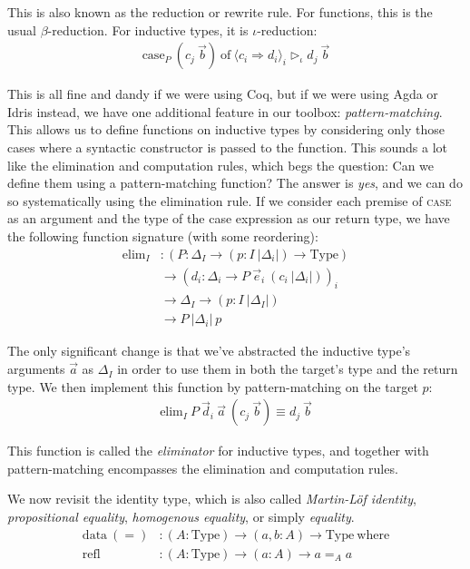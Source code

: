 \documentclass{report}
\newcommand{\const}[1]{\text{#1}}
\newcommand{\data}{\const{data}}
\newcommand{\Type}{\const{Type}}
\newcommand{\where}{\const{where}}
\newcommand{\case}{\const{case}}
\newcommand{\of}{\const{of}}
\newcommand{\elim}{\const{elim}}
\newcommand{\refl}{\const{refl}}
\newcommand{\refrule}[1]{\textsc{#1}}
\begin{document}
This is also known as the reduction or rewrite rule. For functions, this is the usual $\beta$-reduction. For inductive types, it is $\iota$-reduction:
%
\begin{align*}
    \case_P ~ (c_j ~ \Vec{b}) ~ \of ~ \langle c_i \Rightarrow d_i \rangle_i \rhd_\iota d_j ~ \Vec{b}
\end{align*}

This is all fine and dandy if we were using Coq, but if we were using Agda or Idris instead, we have one additional feature in our toolbox: \emph{pattern-matching}. This allows us to define functions on inductive types by considering only those cases where a syntactic constructor is passed to the function. This sounds a lot like the elimination and computation rules, which begs the question: Can we define them using a pattern-matching function? The answer is \emph{yes}, and we can do so systematically using the elimination rule. If we consider each premise of \refrule{case} as an argument and the type of the case expression as our return type, we have the following function signature (with some reordering):
%
\begin{align*}
    \elim_I &: (P : \Delta_I \to (p : I ~ |\Delta_i|) \to \Type) \\
    &\to (d_i : \Delta_i \to P ~ \Vec{e}_i ~ (c_i ~ |\Delta_i|))_i \\
    &\to \Delta_I \to (p : I ~ |\Delta_I|) \\
    &\to P ~ |\Delta_i| ~ p
\end{align*}

The only significant change is that we've abstracted the inductive type's arguments $\Vec{a}$ as $\Delta_I$ in order to use them in both the target's type and the return type. We then implement this function by pattern-matching on the target $p$:
%
\begin{align*}
    \elim_I ~ P ~ \Vec{d}_i ~ \Vec{a} ~ (c_j ~ \Vec{b}) \equiv d_j ~ \Vec{b}
\end{align*}

This function is called the \emph{eliminator} for inductive types, and together with pattern-matching encompasses the elimination and computation rules.

We now revisit the identity type, which is also called \emph{Martin-L\"of identity}, \emph{propositional equality}, \emph{homogenous equality}, or simply \emph{equality}.
%
\begin{align*}
    \data ~ (=) &: (A : \Type) \to (a, b : A) \to \Type ~ \where \\
    \refl &: (A : \Type) \to (a : A) \to a =_A a
\end{align*}
\end{document}
